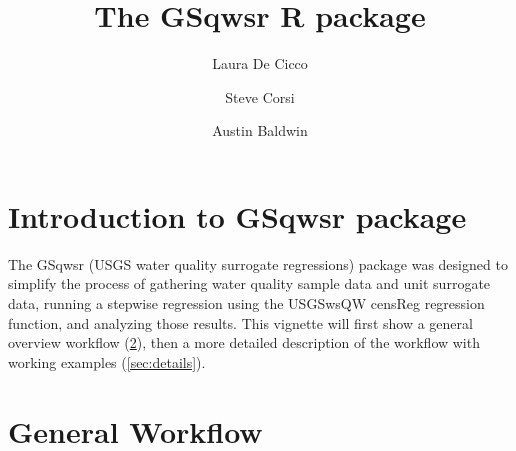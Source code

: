 \documentclass[a4paper,11pt]{article}\usepackage[]{graphicx}\usepackage[]{color}
\begin{document}
\title{The GSqwsr R package}
\author[1]{Laura De Cicco}
\author[1]{Steve Corsi}
\author[1]{Austin Baldwin}






\maketitle
\tableofcontents

\section{Introduction to GSqwsr package}
The GSqwsr (USGS water quality surrogate regressions) package was designed to simplify the process of gathering water quality sample data and unit surrogate data, running a stepwise regression using the USGSwsQW censReg regression function, and analyzing those results. This vignette will first show a general overview workflow  (\ref{sec:workflow}), then a more detailed description of the workflow with working examples (\ref{sec:details}).

\section{General Workflow}
\label{sec:workflow}
\end{document}
